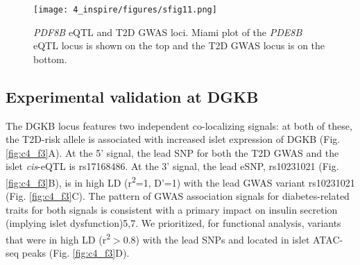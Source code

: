 \begin{figure}
    \centering
    \texttt{[image: 4\_inspire/figures/sfig11.png]}
    \caption[\textit{PDF8B} eQTL and T2D GWAS loci]{\textit{PDF8B} eQTL and T2D GWAS loci. Miami plot of the \textit{PDE8B} eQTL locus is shown on the top and the T2D GWAS locus is on the bottom.}
    \label{fig:c4_sf11}
\end{figure}


\subsection{Experimental validation at DGKB}
The DGKB locus features two independent co-localizing signals: at both of these, the T2D-risk allele is associated with increased islet expression of DGKB (Fig. \ref{fig:c4_f3}A). At the 5' signal, the lead SNP for both the T2D GWAS and the islet \textit{cis}-eQTL is rs17168486. At the 3' signal, the lead eSNP, rs10231021 (Fig. \ref{fig:c4_f3}B), is in high LD (r\textsuperscript{2}=1, D'=1) with the lead GWAS variant rs10231021 (Fig. \ref{fig:c4_f3}C). The pattern of GWAS association signals for diabetes-related traits for both signals is consistent with a primary impact on insulin secretion (implying islet dysfunction)5,7.  We prioritized, for functional analysis, variants that were in high LD (r\textsuperscript{2}$>$0.8) with the lead SNPs and located in islet ATAC-seq peaks (Fig. \ref{fig:c4_f3}D). \\

